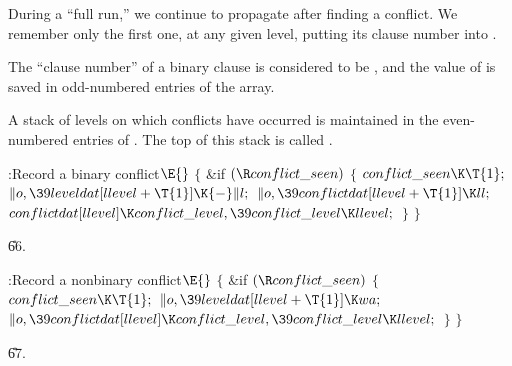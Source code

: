 During a ``full run,'' we continue to propagate after finding a conflict.
We remember only the first one, at any given level,
putting its clause number into .

The ``clause number'' of a binary clause is
considered to be , and the value of  is saved
in odd-numbered entries of the  array.

A stack of levels on which conflicts have occurred is maintained
in the even-numbered entries of . The top of this
stack is called .

\Y\B\4:Record a binary conflict\X${}\E{}$\6
${}\{{}$\1\6
\&{if} ${}(\R\\{conflict\_seen}){}$\5
${}\{{}$\1\6
${}\\{conflict\_seen}\K\T{1};{}$\6
${}\|o,\39\\{leveldat}[\\{llevel}+\T{1}]\K{-}\|l;{}$\6
${}\|o,\39\\{conflictdat}[\\{llevel}+\T{1}]\K\\{ll};{}$\6
${}\\{conflictdat}[\\{llevel}]\K\\{conflict\_level},\39\\{conflict\_level}\K%
\\{llevel};{}$\6
\4${}\}{}$\2\6
\4${}\}{}$\2\par
\U66.\fi

\B{}:Record a nonbinary conflict\X${}\E{}$\6
${}\{{}$\1\6
\&{if} ${}(\R\\{conflict\_seen}){}$\5
${}\{{}$\1\6
${}\\{conflict\_seen}\K\T{1};{}$\6
${}\|o,\39\\{leveldat}[\\{llevel}+\T{1}]\K\\{wa};{}$\6
${}\|o,\39\\{conflictdat}[\\{llevel}]\K\\{conflict\_level},\39\\{conflict%
\_level}\K\\{llevel};{}$\6
\4${}\}{}$\2\6
\4${}\}{}$\2\par
\U67.\fi

